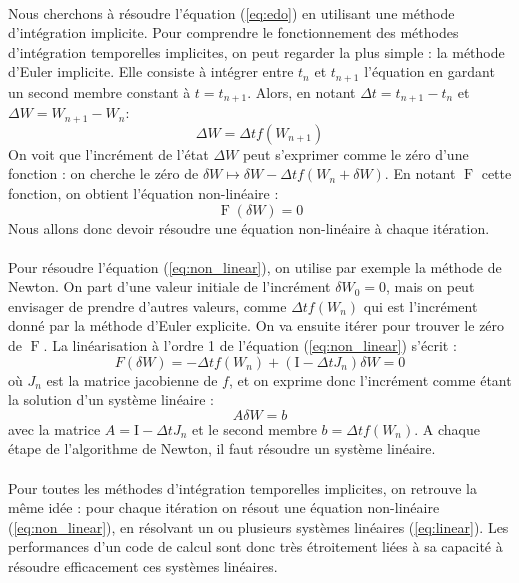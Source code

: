 		\paragraph{}
		Nous cherchons à résoudre l'équation (\ref{eq:edo}) en utilisant une méthode d'intégration implicite.
		Pour comprendre le fonctionnement des méthodes d'intégration temporelles implicites, on peut regarder la plus simple : la méthode d'Euler implicite.
		Elle consiste à intégrer entre $t_n$ et $t_{n+1}$ l'équation en gardant un second membre constant à $t = t_{n+1}$.
		Alors, en notant $\Delta t = t_{n+1} - t_n$ et $\Delta W = W_{n+1} - W_n$:
		$$\Delta W = \Delta t f\left(W_{n+1}\right)$$
		On voit que l'incrément de l'état $\Delta W$ peut s'exprimer comme le zéro d'une fonction : on cherche le zéro de $\delta W \mapsto \delta W - \Delta t f\left(W_n + \delta W\right)$.
		En notant $\operatorname{F}$ cette fonction, on obtient l'équation non-linéaire :
		\begin{equation}\label{eq:non_linear}
			\operatorname{F}\left(\delta W\right) = 0
		\end{equation}
		Nous allons donc devoir résoudre une équation non-linéaire à chaque itération.

		\paragraph{}
		Pour résoudre l'équation (\ref{eq:non_linear}), on utilise par exemple la méthode de Newton.
		On part d'une valeur initiale de l'incrément $\delta W_0 = 0$, mais on peut envisager de prendre d'autres valeurs, comme $\Delta t f\left(W_n\right)$ qui est l'incrément donné par la méthode d'Euler explicite.
		On va ensuite itérer pour trouver le zéro de $\operatorname{F}$.
		La linéarisation à l'ordre 1 de l'équation (\ref{eq:non_linear}) s'écrit :
		$$F(\delta W) = -\Delta t f\left(W_n\right) + \left(\mathrm{I} - \Delta t J_n\right)\delta W = 0$$
		où $J_n$ est la matrice jacobienne de $f$, et on exprime donc l'incrément comme étant la solution d'un système linéaire :
		\begin{equation}\label{eq:linear}
			A\delta W = b
		\end{equation}
		avec la matrice $A = \mathrm{I} - \Delta t J_n$ et le second membre $b = \Delta t f\left(W_n\right)$.
		A chaque étape de l'algorithme de Newton, il faut résoudre un système linéaire.

		\paragraph{}
		Pour toutes les méthodes d'intégration temporelles implicites, on retrouve la même idée : pour chaque itération on résout une équation non-linéaire (\ref{eq:non_linear}), en résolvant un ou plusieurs systèmes linéaires (\ref{eq:linear}).
		Les performances d'un code de calcul sont donc très étroitement liées à sa capacité à résoudre efficacement ces systèmes linéaires.



